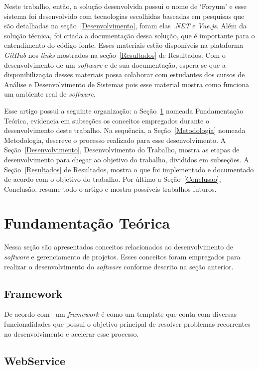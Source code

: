 \documentclass[12pt]{article}
\begin{document}
Neste trabalho, então, a solução desenvolvida possui o nome de `Foryum' e esse sistema foi desenvolvido
com tecnologias escolhidas baseadas em pesquisas que são detalhadas na seção~\ref{Desenvolvimento},
foram elas \textit{.NET} e \textit{Vue.js}. Além da solução técnica, foi criada a documentação dessa solução, que é
importante para o entendimento do código fonte. Esses materiais estão disponíveis na plataforma \textit{GitHub} nos
\textit{links} mostrados na seção~\ref{Resultados} de Resultados. Com o desenvolvimento de um \textit{software}
e de sua documentação, espera-se que a disponibilização desses materiais
possa colaborar com estudantes dos cursos de Análise e Desenvolvimento de Sistemas pois esse material mostra como funciona um ambiente
real de \textit{software}.

Esse artigo possui a seguinte organização: a Seção~\ref{FundamentacaoTeorica} nomeada Fundamentação Teórica,
evidencia em subseções os conceitos empregados durante o desenvolvimento deste trabalho. Na sequência,
a Seção~\ref{Metodologia} nomeada Metodologia, descreve o processo realizado para esse desenvolvimento.
A Seção~\ref{Desenvolvimento}, Desenvolvimento do Trabalho, mostra as etapas de desenvolvimento para chegar ao objetivo do trabalho, divididos em subseções.
A Seção~\ref{Resultados} de Resultados, mostra o que foi implementado e documentado de acordo com o objetivo do trabalho.
Por último a Seção~\ref{Conclusao}, Conclusão, resume todo o artigo e mostra possíveis trabalhos futuros.

\section{Fundamentação Teórica}\label{FundamentacaoTeorica}

Nessa seção são apresentados conceitos relacionados ao desenvolvimento de \textit{software} e gerenciamento
de projetos. Esses conceitos foram empregados para realizar o desenvolvimento do \textit{software} conforme descrito na seção anterior.

\subsection{Framework}

De acordo com~\cite{host12} um
\textit{framework} é como um template que conta com diversas funcionalidades que possui o objetivo principal de
resolver problemas recorrentes no desenvolvimento e acelerar esse processo.

\subsection{WebService}\label{WebService}
\end{document}
